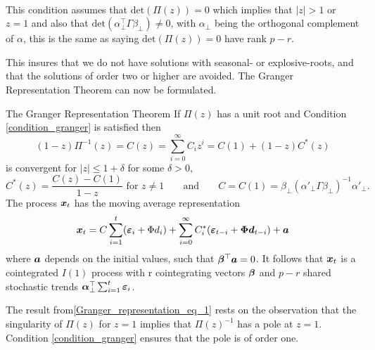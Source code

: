 \begin{condition}\phantom{}\\
    This condition assumes that $\text{det}(\Pi(z))=0$ which implies that $|z|>1$ or $z=1$ and also that $\text{det}(\alpha^\top_{\perp}\Gamma \beta_{\perp})\neq0$, with $\alpha_{\perp}$ being the orthogonal complement of $\alpha$, this is the same as saying $\text{det}(\Pi(z))=0$ have rank $p-r$.
    \label{condition_granger}
\end{condition}

\noindent This insures that we do not have solutions with seasonal- or explosive-roots, and that the solutions of order two or higher are avoided. The Granger Representation Theorem can now be formulated.
\begin{thm}{The Granger Representation Theorem}
    If $\Pi(z)$ has a unit root and Condition \ref{condition_granger} is satisfied then
    \begin{equation}\label{Granger_representation_eq_1}
        (1-z)\Pi^{-1}(z)=C(z)=\sum^{\infty}_{i=0}C_iz^i=C(1)+(1-z)C^\ast(z)
    \end{equation}
    is convergent for $|z|\leq1+\delta
    $ for some $\delta>0$,
    \begin{equation*}
C^{\ast}(z)=\frac{C(z)-C(1)}{1-z}\text{ for }z\neq 1\;\;\;\;\;\;\;\text{and}\;\;\;\;\;\;\;C=C(1)=\beta_\perp(\alpha'_{\perp}\Gamma\beta_{\perp})^{-1}\alpha'_{\perp}.
    \end{equation*}
The process $\boldsymbol{x}_t$ has the moving average representation
\begin{equation}\label{granger_representation_eq_3}
    \boldsymbol{x}_t=C\sum_{i=1}^{t}(\boldsymbol{\varepsilon}_{i}+\Phi d_i)+\sum_{i=0}^{\infty}C_{i}^\ast(\boldsymbol{\varepsilon}_{t-i}+\boldsymbol{\Phi} \boldsymbol{d}_{t-i})+\boldsymbol{a}
\end{equation}
where $\boldsymbol{a}$ depends on the initial values, such that $\boldsymbol{\beta}^\top\boldsymbol{a}=0$. It follows that $\boldsymbol{x}_t$ is a cointegrated $I(1)$ process with r cointegrating vectors $\boldsymbol{\beta}$ and $p-r$ shared stochastic trends $\boldsymbol{\alpha}^\top_{\perp}\sum_{i=1}^{t}\boldsymbol{\varepsilon}_i$.
\end{thm}
\begin{bema}
    The result from\eqref{Granger_representation_eq_1} rests on the observation that the singularity of $\Pi(z)$ for $z=1$ implies that $\Pi(z)^{-1}$ has a pole at $z=1$. Condition \ref{condition_granger} ensures that the pole is of order one.
\end{bema}
